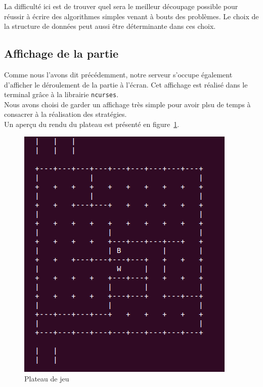 \documentclass[12pt,a4paper]{article}
\begin{document}
La difficulté ici est de trouver quel sera le meilleur découpage possible pour 
réussir à écrire des algorithmes simples venant à bouts des problèmes. Le choix 
de la structure de données peut aussi être déterminante dans ces choix.

\subsection{Affichage de la partie}

Comme nous l'avons dit précédemment, notre serveur s'occupe également d'afficher 
le déroulement de la partie à l'écran. Cet affichage est réalisé dans le terminal 
grâce à la librairie \texttt{ncurses}. \\

Nous avons choisi de garder un affichage très simple pour avoir plsu de temps à
consacrer à la réalisation des stratégies.\\

Un aperçu du rendu du plateau est présenté en figure~\ref{fig:plateau_ncurses}. \\
\begin{figure}[h!]
  \begin{center}
    \includegraphics[scale=0.45]{plateau}
	\caption{Plateau de jeu}
	\label{fig:plateau_ncurses}
  \end{center}
\end{figure}
\end{document}

